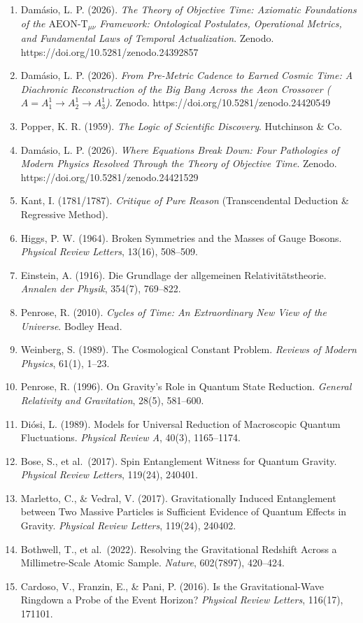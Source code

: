 \documentclass[
]{article}
\providecommand{\tightlist}{%
  \setlength{\itemsep}{0pt}\setlength{\parskip}{0pt}}
\begin{document}
\begin{enumerate}
\def\labelenumi{\arabic{enumi}.}
\tightlist
\item
  Damásio, L. P. (2026). \emph{The Theory of Objective Time: Axiomatic
  Foundations of the \(\text{AEON-T}_{\mu\nu}\) Framework: Ontological
  Postulates, Operational Metrics, and Fundamental Laws of Temporal
  Actualization}. Zenodo. https://doi.org/10.5281/zenodo.24392857
\item
  Damásio, L. P. (2026). \emph{From Pre-Metric Cadence to Earned Cosmic
  Time: A Diachronic Reconstruction of the Big Bang Across the Aeon
  Crossover (\(A = A_1^1 \to A_2^1 \to A_3^1\))}. Zenodo.
  https://doi.org/10.5281/zenodo.24420549
\item
  Popper, K. R. (1959). \emph{The Logic of Scientific Discovery}.
  Hutchinson \& Co.
\item
  Damásio, L. P. (2026). \emph{Where Equations Break Down: Four
  Pathologies of Modern Physics Resolved Through the Theory of Objective
  Time}. Zenodo. https://doi.org/10.5281/zenodo.24421529
\item
  Kant, I. (1781/1787). \emph{Critique of Pure Reason} (Transcendental
  Deduction \& Regressive Method).
\item
  Higgs, P. W. (1964). Broken Symmetries and the Masses of Gauge Bosons.
  \emph{Physical Review Letters}, 13(16), 508--509.
\item
  Einstein, A. (1916). Die Grundlage der allgemeinen
  Relativitätstheorie. \emph{Annalen der Physik}, 354(7), 769--822.
\item
  Penrose, R. (2010). \emph{Cycles of Time: An Extraordinary New View of
  the Universe}. Bodley Head.
\item
  Weinberg, S. (1989). The Cosmological Constant Problem. \emph{Reviews
  of Modern Physics}, 61(1), 1--23.
\item
  Penrose, R. (1996). On Gravity's Role in Quantum State Reduction.
  \emph{General Relativity and Gravitation}, 28(5), 581--600.
\item
  Diósi, L. (1989). Models for Universal Reduction of Macroscopic
  Quantum Fluctuations. \emph{Physical Review A}, 40(3), 1165--1174.
\item
  Bose, S., et al.~(2017). Spin Entanglement Witness for Quantum
  Gravity. \emph{Physical Review Letters}, 119(24), 240401.
\item
  Marletto, C., \& Vedral, V. (2017). Gravitationally Induced
  Entanglement between Two Massive Particles is Sufficient Evidence of
  Quantum Effects in Gravity. \emph{Physical Review Letters}, 119(24),
  240402.
\item
  Bothwell, T., et al.~(2022). Resolving the Gravitational Redshift
  Across a Millimetre-Scale Atomic Sample. \emph{Nature}, 602(7897),
  420--424.
\item
  Cardoso, V., Franzin, E., \& Pani, P. (2016). Is the
  Gravitational-Wave Ringdown a Probe of the Event Horizon?
  \emph{Physical Review Letters}, 116(17), 171101.
\end{enumerate}
\end{document}
